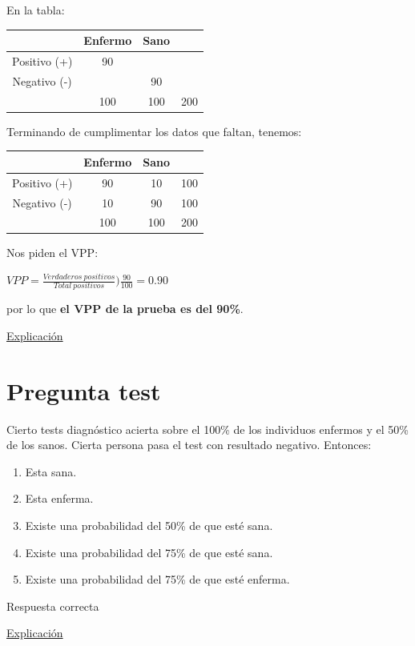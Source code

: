 \documentclass[
]{book}
\providecommand{\tightlist}{%
  \setlength{\itemsep}{0pt}\setlength{\parskip}{0pt}}
\begin{document}
En la tabla:

\begin{longtable}[]{@{}cccc@{}}
\toprule
& Enfermo & Sano &\tabularnewline
\midrule
\endhead
Positivo (+) & 90 & &\tabularnewline
Negativo (-) & & 90 &\tabularnewline
& 100 & 100 & 200\tabularnewline
\bottomrule
\end{longtable}

Terminando de cumplimentar los datos que faltan, tenemos:

\begin{longtable}[]{@{}cccc@{}}
\toprule
& Enfermo & Sano &\tabularnewline
\midrule
\endhead
Positivo (+) & 90 & 10 & 100\tabularnewline
Negativo (-) & 10 & 90 & 100\tabularnewline
& 100 & 100 & 200\tabularnewline
\bottomrule
\end{longtable}

Nos piden el VPP:

\(VPP=\frac{Verdaderos ~ positivos}{Total ~ positivos})\frac{90}{100}=0.90\)

por lo que \textbf{el VPP de la prueba es del 90\%}.

\href{https://1fjmanzano.github.io/bioestadistica/relaci\%C3\%B3n-entre-variables-cualitativas.html\#diagno\%CC\%81stico-cli\%CC\%81nico}{Explicación}

\hypertarget{pregunta-test-164}{%
\section{Pregunta test}\label{pregunta-test-164}}

Cierto tests diagnóstico acierta sobre el 100\% de los individuos enfermos y el 50\% de los sanos. Cierta persona pasa el test con resultado negativo. Entonces:

\begin{enumerate}
\def\labelenumi{\alph{enumi})}
\tightlist
\item
  Esta sana.
\item
  Esta enferma.
\item
  Existe una probabilidad del 50\% de que esté sana.
\item
  Existe una probabilidad del 75\% de que esté sana.
\item
  Existe una probabilidad del 75\% de que esté enferma.
\end{enumerate}

Respuesta correcta

\href{https://1fjmanzano.github.io/bioestadistica/relaci\%C3\%B3n-entre-variables-cualitativas.html\#diagno\%CC\%81stico-cli\%CC\%81nico}{Explicación}
\end{document}

